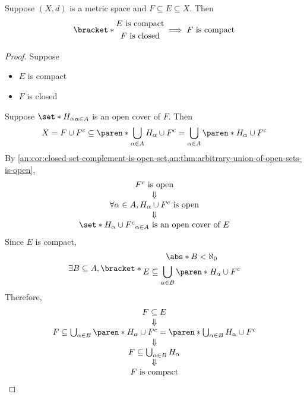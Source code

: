 \begin{theorem} \label{an:thm:closed-subset-of-compact-set-is-compact}
  Suppose $(X, d)$ is a metric space and $F \subseteq E \subseteq X$. Then
  \[
    \bracket*{\begin{gathered}
        E \text{ is compact} \\
        F \text{ is closed}
      \end{gathered}} \implies F \text{ is compact}
  \]
\end{theorem}

\begin{proof}
  Suppose
  \begin{itemize}
    \item $E$ is compact
    \item $F$ is closed
  \end{itemize}
  Suppose $\set*{H_{\alpha}}_{\alpha \in A}$ is an open cover of $F$. Then
  \[
    X = F \cup F^{c} \subseteq \paren*{\bigcup_{\alpha \in A}
      H_{\alpha}} \cup F^{c} = \bigcup_{\alpha \in A} \paren*{H_{\alpha} \cup F^{c}}
  \]
  By \cref{an:cor:closed-set-complement-is-open-set,an:thm:arbitrary-union-of-open-sets-is-open},
  \[
    \begin{array}{c}
      F^{c} \text{ is open}                                       \\
      \Downarrow                                                  \\
      \forall \alpha \in A, H_{\alpha} \cup F^{c} \text{ is open} \\
      \Downarrow                                                  \\
      \set*{H_{\alpha} \cup F^{c}}_{\alpha \in A} \text{ is an open cover of } E
    \end{array}
  \]
  Since $E$ is compact,
  \[
    \exists B \subseteq A,
    \bracket*{\begin{gathered}
        \abs*{B} < \aleph_{0} \\
        E \subseteq \bigcup_{\alpha \in B} \paren*{H_{\alpha} \cup F^{c}}
      \end{gathered}}
  \]
  Therefore,
  \[
    \begin{array}{c}
      F \subseteq E                                           \\
      \Downarrow                                              \\
      F \subseteq \bigcup_{\alpha \in B} \paren*{H_{\alpha} \cup F^{c}}
      = \paren*{\bigcup_{\alpha \in B} H_{\alpha}} \cup F^{c} \\
      \Downarrow                                              \\
      F \subseteq \bigcup_{\alpha \in B} H_{\alpha}           \\
      \Downarrow                                              \\
      F \text{ is compact}
    \end{array}
  \]
\end{proof}

